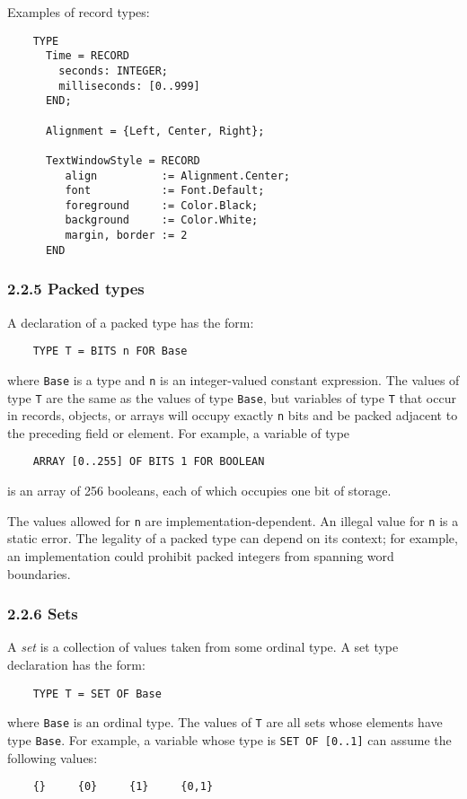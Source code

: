 \documentclass[10pt]{article}
\begin{document}
Examples of record types:
\begin{verbatim}
    TYPE
      Time = RECORD
        seconds: INTEGER;
        milliseconds: [0..999]
      END;

      Alignment = {Left, Center, Right};

      TextWindowStyle = RECORD
         align          := Alignment.Center;
         font           := Font.Default;
         foreground     := Color.Black;
         background     := Color.White;
         margin, border := 2
      END
\end{verbatim}

\subsubsection*{2.2.5 Packed types}

A declaration of a packed type has the form:
\begin{verbatim}
    TYPE T = BITS n FOR Base
\end{verbatim}
where \verb|Base| is a type and \verb|n| is an integer-valued constant
expression.  The values of type \verb|T| are the same as the values of type
\verb|Base|, but variables of type \verb|T| that occur in records, objects, or
arrays will occupy exactly \verb|n| bits and be packed adjacent to the
preceding field or element.  For example, a variable of type
\begin{verbatim}
    ARRAY [0..255] OF BITS 1 FOR BOOLEAN
\end{verbatim}
is an array of 256 booleans, each of which occupies one bit of storage.

The values allowed for \verb|n| are implementation-dependent.  An illegal
value for \verb|n| is a static error.  The legality of a packed type can
depend on its context; for example, an implementation could prohibit packed
integers from spanning word boundaries.

\subsubsection*{2.2.6 Sets}

A \emph{set} is a collection of values taken from some ordinal type.  A set
type declaration has the form:
\begin{verbatim}
    TYPE T = SET OF Base
\end{verbatim}
where \verb|Base| is an ordinal type.  The values of \verb|T| are all sets
whose elements have type \verb|Base|.  For example, a variable whose type is
\verb|SET OF [0..1]| can assume the following values:
\begin{verbatim}
    {}     {0}     {1}     {0,1}
\end{verbatim}
\end{document}
